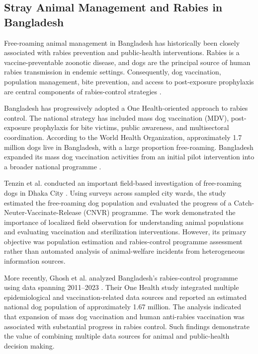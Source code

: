 \documentclass[conference]{IEEEtran}
\begin{document}
\subsection{Stray Animal Management and Rabies in Bangladesh}

Free-roaming animal management in Bangladesh has historically been closely
associated with rabies prevention and public-health interventions. Rabies is
a vaccine-preventable zoonotic disease, and dogs are the principal source of
human rabies transmission in endemic settings. Consequently, dog vaccination,
population management, bite prevention, and access to post-exposure
prophylaxis are central components of rabies-control strategies
\cite{who_rabies_bd}.

Bangladesh has progressively adopted a One Health-oriented approach to rabies
control. The national strategy has included mass dog vaccination (MDV),
post-exposure prophylaxis for bite victims, public awareness, and
multisectoral coordination. According to the World Health Organization,
approximately 1.7 million dogs live in Bangladesh, with a large proportion
free-roaming. Bangladesh expanded its mass dog vaccination activities from
an initial pilot intervention into a broader national programme
\cite{who_mdv_2022}.

Tenzin et al. conducted an important field-based investigation of
free-roaming dogs in Dhaka City \cite{tenzin2015}. Using surveys across
sampled city wards, the study estimated the free-roaming dog population and
evaluated the progress of a Catch-Neuter-Vaccinate-Release (CNVR) programme.
The work demonstrated the importance of localized field observation for
understanding animal populations and evaluating vaccination and sterilization
interventions. However, its primary objective was population estimation and
rabies-control programme assessment rather than automated analysis of
animal-welfare incidents from heterogeneous information sources.

More recently, Ghosh et al. analyzed Bangladesh's rabies-control programme
using data spanning 2011--2023 \cite{ghosh2024}. Their One Health study
integrated multiple epidemiological and vaccination-related data sources and
reported an estimated national dog population of approximately 1.67 million.
The analysis indicated that expansion of mass dog vaccination and human
anti-rabies vaccination was associated with substantial progress in rabies
control. Such findings demonstrate the value of combining multiple data
sources for animal and public-health decision making.
\end{document}
